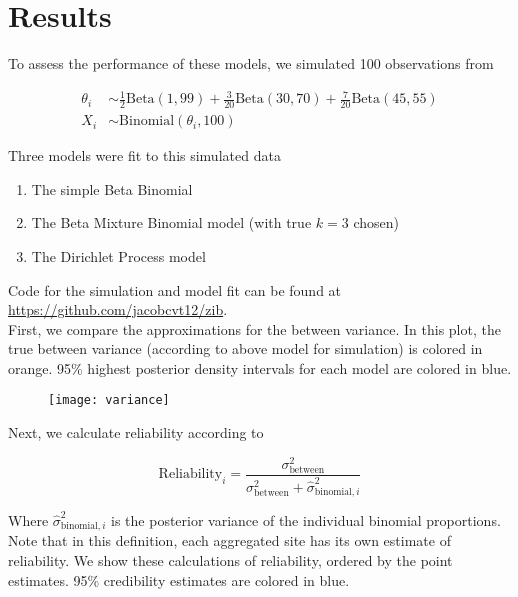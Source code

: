\documentclass{article}
\begin{document}
\section{Results}

To assess the performance of these models, we simulated 100 observations from

\begin{equation}\label{eq:data-sim}
    \begin{split}
    \theta_i &\sim \frac{1}{2} \text{Beta}(1, 99) + \frac{3}{20} \text{Beta}(30, 70) +\frac{7}{20} \text{Beta}(45, 55) \\
    X_i &\sim \text{Binomial}(\theta_i, 100)
    \end{split}
\end{equation}

Three models were fit to this simulated data

\begin{enumerate}[1]
    \item The simple Beta Binomial
    \item The Beta Mixture Binomial model (with true $k=3$ chosen)
    \item The Dirichlet Process model
\end{enumerate}

Code for the simulation and model fit can be found at \url{https://github.com/jacobcvt12/zib}. \\

First, we compare the approximations for the between variance. In this plot, the true between variance (according to above model for simulation) is colored in orange. 95\% highest posterior density intervals for each model are colored in blue.

\begin{figure}[H]
\texttt{[image: variance]}
\end{figure}

Next, we calculate reliability according to~\cite{Adams2009}

\begin{equation}\label{eq:reliability}
    \text{Reliability}_i=\frac{\sigma^2_{\text{between}}}{\sigma^2_{\text{between}}+\hat{\sigma}^2_{\text{binomial},i}}
\end{equation}

Where $\hat{\sigma}^2_{\text{binomial},i}$ is the posterior variance of the individual binomial proportions. Note that in this definition, each aggregated site has its own estimate of reliability. We show these calculations of reliability, ordered by the point estimates. 95\% credibility estimates are colored in blue.
\end{document}
